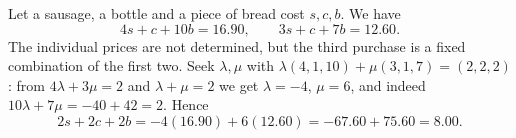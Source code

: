 Let a sausage, a bottle and a piece of bread cost $s,c,b$. We have
\[
4s+c+10b=16.90,\qquad 3s+c+7b=12.60 .
\]
The individual prices are not determined, but the third purchase is a fixed combination of the first two. Seek $\lambda,\mu$ with $\lambda(4,1,10)+\mu(3,1,7)=(2,2,2)$: from $4\lambda+3\mu=2$ and $\lambda+\mu=2$ we get $\lambda=-4$, $\mu=6$, and indeed $10\lambda+7\mu=-40+42=2$. Hence
\[
2s+2c+2b=-4(16.90)+6(12.60)=-67.60+75.60=\boxed{8.00}.
\]
